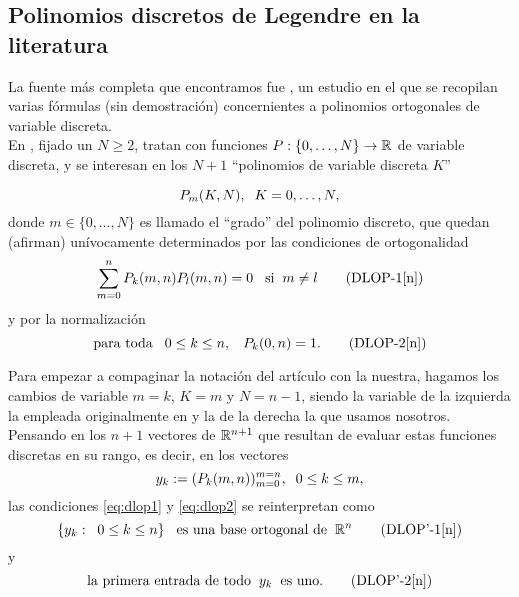 \subsection{Polinomios discretos de Legendre en la literatura}
La fuente más completa que encontramos 
fue \cite{Neuman}, un estudio en el que se recopilan 
varias fórmulas (sin demostración) concernientes a polinomios
ortogonales de variable discreta. \\

En \cite{Neuman}, 
fijado un $N \geq 2$,
tratan con funciones $P : \{0, \ldots , N \} \rightarrow \mathbb{R}$
de variable discreta, y 
se interesan en los $N+1$ ``polinomios de variable
discreta $K$''

\[
P_{m}(K, N), \hspace{0.2cm} K=0, \ldots , N,
\]
donde $m \in \{0, \ldots, N \}$ es llamado el ``grado''
del polinomio discreto, que quedan (afirman)
unívocamente determinados por las condiciones
de ortogonalidad
\begin{equation}
\sum\limits_{m=0}^{n}P_{k}(m,n) P_{l}(m,n) =0
\hspace{0.3cm} \text{si} \hspace{0.2cm} m \neq l \tag{DLOP-1[n]} \label{eq:dlop1}
\end{equation}
y por la normalización
\begin{equation}
\text{para toda} \hspace{0.3cm} 0 \leq k \leq n, \hspace{0.3cm} P_{k}(0, n)=1.   \tag{DLOP-2[n]} \label{eq:dlop2}
\end{equation}

Para empezar a compaginar la notación
del artículo con la nuestra, 
hagamos
los cambios de variable $m=k$, $K=m$
y $N=n-1$, siendo la variable de la izquierda la empleada
originalmente en
\cite{Neuman} y la de la derecha la que usamos nosotros. \\

Pensando en los 
$n+1$ vectores de $\mathbb{R}^{n+1}$ que resultan
de evaluar estas funciones discretas en su rango,
es decir, en los vectores
\begin{equation}
y_{k}:= (P_{k}(m, n))_{m=0}^{m=n}, \hspace{0.2cm}
0 \leq k \leq m,
\end{equation}
las condiciones \eqref{eq:dlop1} y \eqref{eq:dlop2}
se reinterpretan como
\begin{equation}
\{ y_{k}: \hspace{0.2cm} 0 \leq k \leq n\}
\hspace{0.3cm} \text{es una
base ortogonal de} \hspace{0.2cm} \mathbb{R}^{n}
\tag{DLOP'-1[n]} \label{eq:dlop'1}
\end{equation}
y 
\begin{equation}
\text{la primera
entrada de todo} \hspace{0.2cm} y_{k} \hspace{0.2cm}
\text{es uno.} 
\tag{DLOP'-2[n]} \label{eq:dlop'2}
\end{equation}


